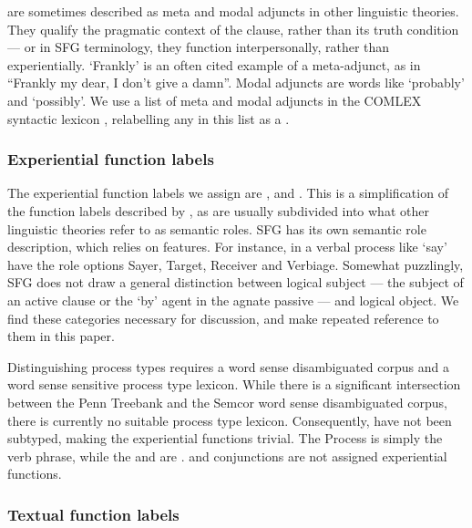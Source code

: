 \documentclass[11pt]{article}
\begin{document}
 are sometimes described as meta and modal adjuncts in other linguistic theories. They qualify the pragmatic context of the clause, rather than its truth condition --- or in SFG terminology, they function interpersonally, rather than experientially. `Frankly' is an often cited example of a meta-adjunct, as in ``Frankly my dear, I don't give a damn''. Modal adjuncts are words like `probably' and `possibly'. We use a list of meta and modal adjuncts in the COMLEX syntactic lexicon \citep{comlex}, relabelling any  in this list as a . 

\subsubsection{Experiential function labels}
The experiential function labels we assign are ,  and . This is a simplification of the function labels described by \citet{ifg}, as  are usually subdivided into what other linguistic theories refer to as semantic roles. SFG has its own semantic role description, which relies on  features. For instance,  in a verbal process like `say' have the role options Sayer, Target, Receiver and Verbiage. Somewhat puzzlingly, SFG does not draw a general distinction between logical subject --- the subject of an active clause or the `by' agent in the agnate passive --- and logical object. We find these categories necessary for discussion, and make repeated reference to them in this paper.

Distinguishing process types requires a word sense disambiguated corpus and a word sense sensitive process type lexicon. While there is a significant intersection between the Penn Treebank and the Semcor word sense disambiguated corpus, there is currently no suitable process type lexicon. Consequently,  have not been subtyped, making the experiential functions trivial. The Process is simply the verb phrase, while the  and  are .  and conjunctions are not assigned experiential functions.

\subsubsection{Textual function labels}
\end{document}
